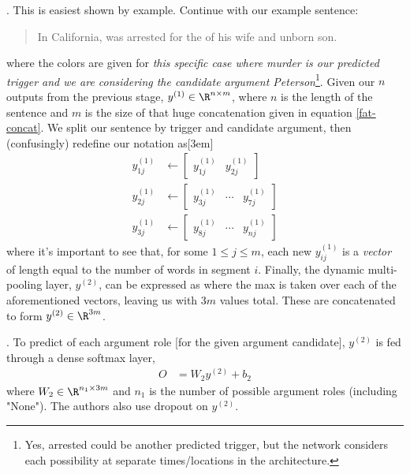 \documentclass[11pt]{article}
\begin{document}
\myspace
\p {}. This is easiest shown by example. Continue with our example sentence:
\begin{quote}
	In California,  was arrested for the  of his wife and unborn son.
\end{quote}
where the colors are given for \textit{this specific case where murder is our predicted trigger and we are considering the candidate argument Peterson}\footnote{Yes, arrested could be another predicted trigger, but the network considers each possibility at separate times/locations in the architecture.}. Given our $n$ outputs from the previous stage, $y^{(1)} \in \R^{n \times m}$, where $n$ is the length of the sentence and $m$ is the size of that huge concatenation given in equation \ref{fat-concat}. We split our sentence by trigger and candidate argument, then (confusingly) redefine our notation as[3em]
\begin{align}
{y}^{(1)}_{1j} &\leftarrow \begin{bmatrix} y^{(1)}_{1j} & y^{(1)}_{2j} \end{bmatrix} \\
{y}^{(1)}_{2j} &\leftarrow \begin{bmatrix} y^{(1)}_{3j} & \cdots & y^{(1)}_{7j} \end{bmatrix} \\
{y}^{(1)}_{3j} &\leftarrow \begin{bmatrix} y^{(1)}_{8j} & \cdots & y^{(1)}_{nj} \end{bmatrix} 
\end{align}
where it's important to see that, for some $1 \le j \le m$, each new $y^{(1)}_{ij}$ is a \textit{vector} of length equal to the number of words in segment $i$. Finally, the dynamic multi-pooling layer, $y^{(2)}$, can be expressed as 
where the max is taken over each of the aforementioned vectors, leaving us with $ 3m $ values total. These are concatenated to form $y^{(2)} \in \R^{3m}$. 


\myspace
\p {}. To predict of each argument role [for the given argument candidate], $y^{(2)}$ is fed through a dense softmax layer,
\begin{align}
O &= W_2 y^{(2)} + b_2
\end{align}
where $W_2 \in \R^{n_1 \times 3m}$ and $n_1$ is the number of possible argument roles (including "None"). The authors also use dropout on $y^{(2)}$.
\end{document}
